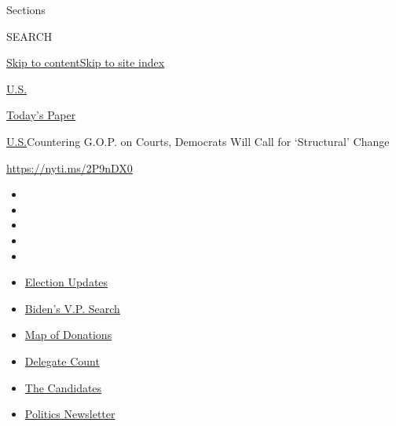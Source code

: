 Sections

SEARCH

\protect\hyperlink{site-content}{Skip to
content}\protect\hyperlink{site-index}{Skip to site index}

\href{https://www.nytimes.com/section/us}{U.S.}

\href{https://myaccount.nytimes.com/auth/login?response_type=cookie\&client_id=vi}{}

\href{https://www.nytimes.com/section/todayspaper}{Today's Paper}

\href{/section/us}{U.S.}\textbar{}Countering G.O.P. on Courts, Democrats
Will Call for `Structural' Change

\url{https://nyti.ms/2P9nDX0}

\begin{itemize}
\item
\item
\item
\item
\item
\end{itemize}

\begin{itemize}
\item
  \href{https://www.nytimes.com/2020/07/31/us/elections/biden-vs-trump.html?action=click\&pgtype=Article\&state=default\&region=TOP_BANNER\&context=storylines_menu}{Election
  Updates}
\item
  \href{https://www.nytimes.com/article/biden-vice-president-2020.html?action=click\&pgtype=Article\&state=default\&region=TOP_BANNER\&context=storylines_menu}{Biden's
  V.P. Search}
\item
  \href{https://www.nytimes.com/interactive/2020/07/24/us/politics/trump-biden-campaign-donors.html?action=click\&pgtype=Article\&state=default\&region=TOP_BANNER\&context=storylines_menu}{Map
  of Donations}
\item
  \href{https://www.nytimes.com/interactive/2020/us/elections/delegate-count-primary-results.html?action=click\&pgtype=Article\&state=default\&region=TOP_BANNER\&context=storylines_menu}{Delegate
  Count}
\item
  \href{https://www.nytimes.com/interactive/2019/us/politics/2020-presidential-candidates.html?action=click\&pgtype=Article\&state=default\&region=TOP_BANNER\&context=storylines_menu}{The
  Candidates}
\item
  \href{https://www.nytimes.com/newsletters/politics?action=click\&pgtype=Article\&state=default\&region=TOP_BANNER\&context=storylines_menu}{Politics
  Newsletter}
\end{itemize}


